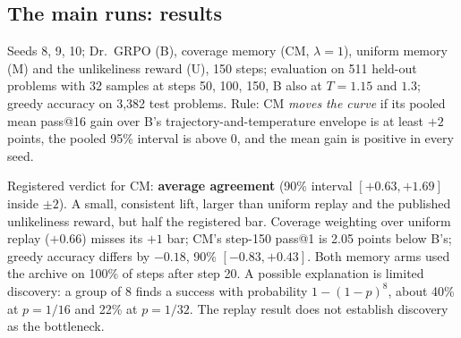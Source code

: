 \documentclass[11pt]{article}
\begin{document}
\subsection{The main runs: results}
Seeds 8, 9, 10; Dr.\ GRPO (B), coverage memory (CM, $\lambda=1$), uniform memory (M) and the unlikeliness reward (U), 150 steps; evaluation on 511 held-out problems with 32 samples at steps 50, 100, 150, B also at $T=1.15$ and $1.3$; greedy accuracy on 3,382 test problems. Rule: CM \emph{moves the curve} if its pooled mean pass@16 gain over B's trajectory-and-temperature envelope is at least $+2$ points, the pooled 95\% interval is above 0, and the mean gain is positive in every seed.

\begin{center}\small
{}
\end{center}
\begin{found}
Registered verdict for CM: \textbf{average agreement} (90\% interval $[+0.63,+1.69]$ inside $\pm2$). A small, consistent lift, larger than uniform replay and the published unlikeliness reward, but half the registered bar. Coverage weighting over uniform replay ($+0.66$) misses its $+1$ bar; CM's step-150 pass@1 is 2.05 points below B's; greedy accuracy differs by $-0.18$, 90\% $[-0.83,+0.43]$. Both memory arms used the archive on 100\% of steps after step 20. A possible explanation is limited discovery: a group of 8 finds a success with probability $1-(1-p)^8$, about 40\% at $p=1/16$ and 22\% at $p=1/32$. The replay result does not establish discovery as the bottleneck.
\end{found}

\end{document}
